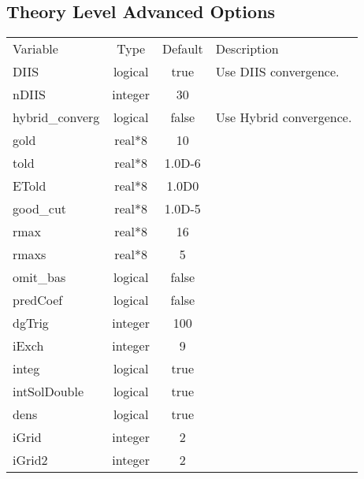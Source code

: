 \documentclass[journal=jctcce,manuscript=article]{achemso}
\begin{document}
    \subsection{Theory Level Advanced Options}
    \begin{table}  [H]
      \begin{center}
      \begin{tabular}{ l c c l}
         Variable & Type & Default & Description \\
         DIIS & logical & true & Use DIIS convergence. \\
         nDIIS & integer & 30 & \\
         hybrid\_converg & logical & false & Use Hybrid convergence. \\
         gold & real*8 & 10 & \\
         told & real*8 & 1.0D-6 & \\
         ETold & real*8 & 1.0D0 & \\
         good\_cut & real*8 & 1.0D-5 & \\
         rmax & real*8 & 16 & \\
         rmaxs & real*8 & 5 & \\
         omit\_bas & logical & false & \\
         predCoef & logical & false & \\
         dgTrig & integer & 100 & \\
         iExch & integer & 9 & \\
         integ & logical & true & \\
         intSolDouble & logical & true & \\
         dens & logical & true & \\
         iGrid & integer & 2 & \\
         iGrid2 & integer & 2 & \\         
       \end{tabular}
       \end{center}
      \label{lio.theorya.var}
    \end{table}    
    
\end{document}
